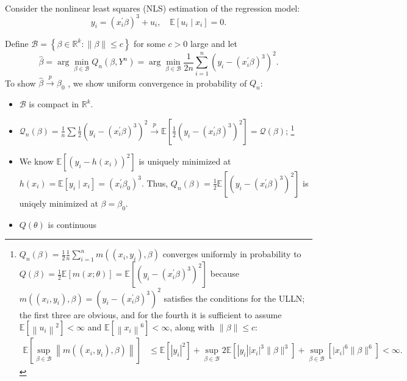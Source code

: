 \begin{eg}
    \

    Consider the nonlinear least squares (NLS) estimation of the regression model:
    \[y_{i}=\left(x_{i}^{\prime} \beta\right)^{3}+u_{i}, \quad \mathbb{E}\left[u_{i} \mid x_{i}\right]=0 .\]

    Define  $\mathscr{B}=\left\{\beta \in \mathbb{R}^{k}:\|\beta\| \leq c\right\}$ for some $c>0$ large and let
    \[
    \hat{\beta}=\arg \min _{\beta \in \mathscr{B}} Q_{n}\left(\beta, Y^{n}\right)=\arg \min _{\beta \in \mathcal{B}} \frac{1}{2 n} \sum_{i=1}^{n}\left(y_{i}-\left(x_{i}^{\prime} \beta\right)^{3}\right)^{2} .
    \]
    To show  $\hat{\beta} \xrightarrow{p} \beta_{0}$ , we show uniform convergence in probability of  $Q_{n}$:
    \begin{itemize}
        \item $\mathscr{B}$  is compact in $\mathbb{R}^{k}$.
        \item $\mathcal{Q}_n(\beta) = \frac{1}{n} \sum \frac{1}{2} \left(y_i - (x_i^{\prime} \beta)^3\right)^2 \overset{p}{\rightarrow} \mathbb{E}\left[\frac{1}{2} \left(y_i - (x_i^{\prime} \beta)^3\right)^2 \right] = \mathcal{Q} (\beta)$;
        \footnote{$Q_{n}(\beta)=\frac{1}{2} \frac{1}{n} \sum_{i=1}^{n} m\left(\left(x_{i}, y_{i}\right), \beta\right)$ converges uniformly in probability to 
        $Q(\beta)=\frac{1}{2} \mathbb{E}[m(x ; \theta)]=   \mathbb{E}\left[\left(y_{i}-\left(x_{i}^{\prime} \beta\right)^{3}\right)^{2}\right]$
        because $m\left(\left(x_{i}, y_{i}\right), \beta\right)=\left(y_{i}-\left(x_{i}^{\prime} \beta\right)^{3}\right)^{2}$  satisfies the conditions for the ULLN; 
        the first three are obvious, and for the fourth it is sufficient to assume $\mathbb{E}\left[\left\|u_{i}\right\|^{2}\right]<\infty$ and $\mathbb{E}\left[\left\|x_{i}\right\|^{6}\right]<\infty$, along with $\|\beta\| \leq c$:
        \begin{align*}
            \mathbb{E}\left[\sup _{\beta \in \mathscr{B}}\left\|m\left(\left(x_{i}, y_{i}\right), \beta\right)\right\|\right] &\leqslant \mathbb{E}\left[\left|y_{i}\right|^{2}\right]+\sup _{\beta \in \mathscr{B}} 2 \mathbb{E}\left[\left|y_{i}\right|\left|x_{i}\right|^{3}\|\beta\|^{3}\right]+\sup _{\beta \in \mathscr{B}}\left[\left|x_{i}\right|^{6}\|\beta\|^{6}\right] <\infty .
        \end{align*}
        }
        \item We know $\mathbb{E}\left[\left(y_{i}-h\left(x_{i}\right)\right)^{2}\right]$ is uniquely minimized at $h\left(x_{i}\right)=\mathbb{E}\left[y_{i} \mid x_{i}\right]=\left(x_{i}^{\prime} \beta_{0}\right)^{3}$.
        Thus, $Q_{n}(\beta)=\frac{1}{2} \mathbb{E}\left[\left(y_{i}-\left(x_{i}^{\prime} \beta\right)^{3}\right)^{2}\right]$ is uniqely minimized at $\beta=\beta_{0}$.
        \item $Q(\theta)$ is continuous
    \end{itemize}
\end{eg}

